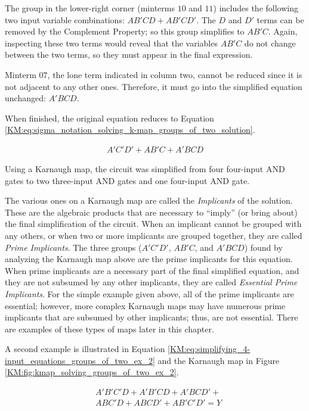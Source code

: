 The group in the lower-right corner (minterms $ 10 $ and $ 11 $) includes the following two input variable combinations: $ AB'CD + AB'CD' $. The $ D $ and $ D' $ terms can be removed by the Complement Property; so this group simplifies to $ AB'C $. Again, inspecting these two terms would reveal that the variables $ AB'C $ do not change between the two terms, so they must appear in the final expression. 

Minterm $ 07 $, the lone term indicated in column two, cannot be reduced since it is not adjacent to any other ones. Therefore, it must go into the simplified equation unchanged: $ A'BCD $. 

When finished, the original equation reduces to Equation \ref{KM:eq:sigma_notation_solving_k-map_groups_of_two_solution}.

\begin{align}
  \label{KM:eq:sigma_notation_solving_k-map_groups_of_two_solution}
  A'C'D'+AB'C+A'BCD
\end{align}

Using a Karnaugh map, the circuit was simplified from four four-input \textsf{AND} gates to two three-input \textsf{AND} gates and one four-input \textsf{AND} gate. 

The various ones on a Karnaugh map are called the \emph{Implicants} of the solution. These are the algebraic products that are necessary to ``imply'' (or bring about) the final simplification of the circuit. When an implicant cannot be grouped with any others, or when two or more implicants are grouped together, they are called \emph{Prime Implicants}. The three groups ($ A'C'D' $, $ AB'C $, and $ A'BCD $) found by analyzing the Karnaugh map above are the prime implicants for this equation. When prime implicants are a necessary part of the final simplified equation, and they are not subsumed by any other implicants, they are called \emph{Essential Prime Implicants}. For the simple example given above, all of the prime implicants are essential; however, more complex Karnaugh maps may have numerous prime implicants that are subsumed by other implicants; thus, are not essential. There are examples of these types of maps later in this chapter. 

A second example is illustrated in Equation \ref{KM:eq:simplifying_4-input_equations_groups_of_two_ex_2} and the Karnaugh map in Figure \ref{KM:fig:kmap_solving_groups_of_two_ex_2}.

\begin{align}
  \label{KM:eq:simplifying_4-input_equations_groups_of_two_ex_2}
  &A'B'C'D+A'B'CD+A'BCD'+ \\
  \nonumber
  &ABC'D+ABCD'+AB'C'D'=Y
\end{align}

